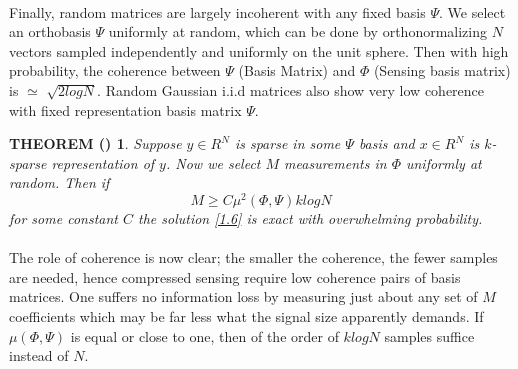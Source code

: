 \paragraph{}Finally, random matrices are largely incoherent with any fixed basis $\Psi$. We select an orthobasis $\Psi$ 
uniformly at random, which can be done by orthonormalizing $N$ vectors sampled independently and uniformly on the unit 
sphere. Then with high probability, the coherence between $\Psi$ (Basis Matrix) and $\Phi$ (Sensing basis matrix) is 
$\simeq$ $\sqrt{2 logN}$. Random Gaussian i.i.d matrices also show very low coherence with fixed representation basis matrix $\Psi$.


\newtheorem{csth}{THEOREM (\cite{cand07})}
\begin{csth}
 Suppose $y \in R^N$ is sparse in some $\Psi$ basis and $x \in R^N$ is $k$-sparse representation of $y$. Now we select
$M$ measurements in $\Phi$ uniformly at random. Then if 
\begin{equation}
 M \geq C \mu^2(\Phi,\Psi)klogN
\end{equation}
for some constant $C$ the solution \ref{1.6} is exact with overwhelming probability.
\end{csth}

\paragraph{}The role of coherence is now clear; the smaller the coherence, the fewer samples are needed,
hence compressed sensing require low coherence pairs of basis matrices. One suffers no information loss by measuring just
about any set of $M$ coefficients which may be far less what the signal size apparently demands. If $\mu(\Phi,\Psi)$ is equal or
close to one, then of the order of $klogN$ samples suffice instead of $N$.

